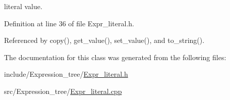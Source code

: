\hypertarget{classgenevalmag_1_1Expr__literal_a914b947ed414c6aae35eb7abcf8c7128}{
\subsubsection[{value}]{}}
\label{classgenevalmag_1_1Expr__literal_a914b947ed414c6aae35eb7abcf8c7128}


literal value. 



Definition at line 36 of file Expr\_\-literal.h.



Referenced by copy(), get\_\-value(), set\_\-value(), and to\_\-string().



The documentation for this class was generated from the following files:\begin{DoxyCompactItemize}
\item 
include/Expression\_\-tree/\hyperlink{Expr__literal_8h}{Expr\_\-literal.h}\item 
src/Expression\_\-tree/\hyperlink{Expr__literal_8cpp}{Expr\_\-literal.cpp}\end{DoxyCompactItemize}

